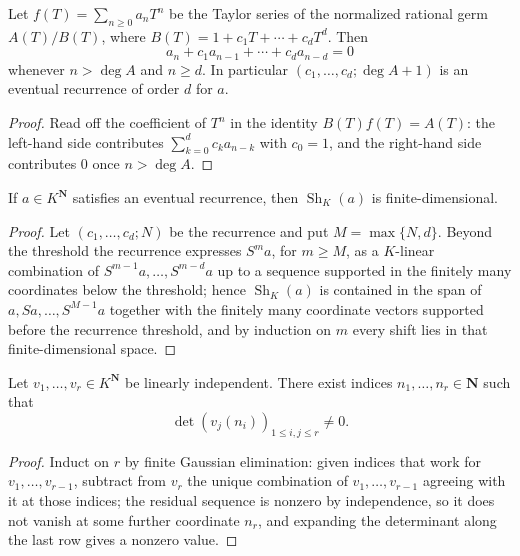 \begin{lemma}
\label{lem:zla-germ-recurrence}
\leanok
Let $f(T)=\sum_{n\geq0}a_nT^n$ be the Taylor series of the normalized rational
germ $A(T)/B(T)$, where $B(T)=1+c_1T+\cdots+c_dT^d$.  Then
\[
  a_n+c_1a_{n-1}+\cdots+c_da_{n-d}=0
\]
whenever $n>\deg A$ and $n\geq d$.  In particular $(c_1,\ldots,c_d;\deg A+1)$
is an eventual recurrence of order $d$ for $a$.
\end{lemma}
\begin{proof}
\leanok
Read off the coefficient of $T^n$ in the identity $B(T)f(T)=A(T)$: the
left-hand side contributes $\sum_{k=0}^{d}c_ka_{n-k}$ with $c_0=1$, and the
right-hand side contributes $0$ once $n>\deg A$.
\end{proof}

\begin{lemma}
\label{lem:zla-recurrence-shift-span}
\leanok
If $a\in K^{\mathbf N}$ satisfies an eventual recurrence, then
$\operatorname{Sh}_K(a)$ is finite-dimensional.
\end{lemma}
\begin{proof}
\leanok
Let $(c_1,\ldots,c_d;N)$ be the recurrence and put
$M=\max\{N,d\}$.  Beyond the threshold the recurrence expresses $S^ma$, for
$m\geq M$, as a $K$-linear combination of $S^{m-1}a,\ldots,S^{m-d}a$ up to a
sequence supported in the finitely many coordinates below the threshold; hence
$\operatorname{Sh}_K(a)$ is contained in the span of
$a,Sa,\ldots,S^{M-1}a$ together with the finitely many coordinate vectors
supported before the recurrence threshold, and by induction on $m$ every shift
lies in that finite-dimensional space.
\end{proof}

\begin{lemma}
\label{lem:zla-finite-coordinates}
\leanok
Let $v_1,\ldots,v_r\in K^{\mathbf N}$ be linearly independent.  There exist
indices $n_1,\ldots,n_r\in\mathbf N$ such that
\[
  \det\left(v_j(n_i)\right)_{1\leq i,j\leq r}\neq0.
\]
\end{lemma}
\begin{proof}
\leanok
Induct on $r$ by finite Gaussian elimination: given indices that work for
$v_1,\ldots,v_{r-1}$, subtract from $v_r$ the unique combination of
$v_1,\ldots,v_{r-1}$ agreeing with it at those indices; the residual sequence
is nonzero by independence, so it does not vanish at some further coordinate
$n_r$, and expanding the determinant along the last row gives a nonzero
value.
\end{proof}

